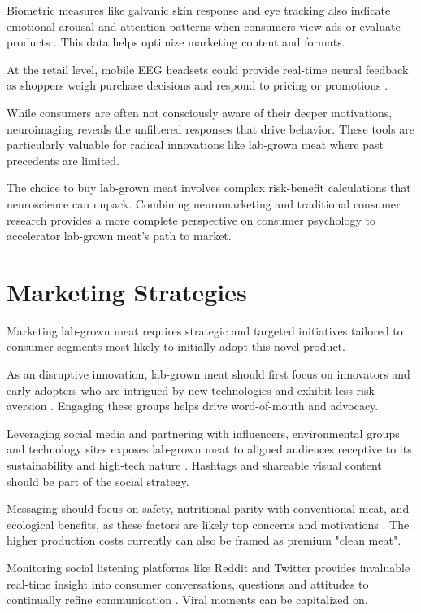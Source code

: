 \documentclass[10pt]{article}
\begin{document}
\begin{sloppypar}
  Biometric measures like galvanic skin response and eye tracking also indicate emotional arousal and attention patterns when consumers view ads or evaluate products \citep{riedl_decade_2020}. This data helps optimize marketing content and formats.

  At the retail level, mobile EEG headsets could provide real-time neural feedback as shoppers weigh purchase decisions and respond to pricing or promotions \citep{fisher_defining_2010}.

  While consumers are often not consciously aware of their deeper motivations, neuroimaging reveals the unfiltered responses that drive behavior. These tools are particularly valuable for radical innovations like lab-grown meat where past precedents are limited.

  The choice to buy lab-grown meat involves complex risk-benefit calculations that neuroscience can unpack. Combining neuromarketing and traditional consumer research provides a more complete perspective on consumer psychology to accelerator lab-grown meat’s path to market.

  \section{Marketing Strategies}
  \label{sec:marketing-strategies}

  Marketing lab-grown meat requires strategic and targeted initiatives tailored to consumer segments most likely to initially adopt this novel product.

  As an disruptive innovation, lab-grown meat should first focus on innovators and early adopters who are intrigued by new technologies and exhibit less risk aversion \citep{m_rogers_diffusion_2003}. Engaging these groups helps drive word-of-mouth and advocacy.

  Leveraging social media and partnering with influencers, environmental groups and technology sites exposes lab-grown meat to aligned audiences receptive to its sustainability and high-tech nature \citep{goodwin_future_2013}. Hashtags and shareable visual content should be part of the social strategy.

  Messaging should focus on safety, nutritional parity with conventional meat, and ecological benefits, as these factors are likely top concerns and motivations \citep{circus_exploring_2018}. The higher production costs currently can also be framed as premium "clean meat".

  Monitoring social listening platforms like Reddit and Twitter provides invaluable real-time insight into consumer conversations, questions and attitudes to continually refine communication \citep{verbeke_would_2015}. Viral moments can be capitalized on.


\end{sloppypar}
\end{document}
